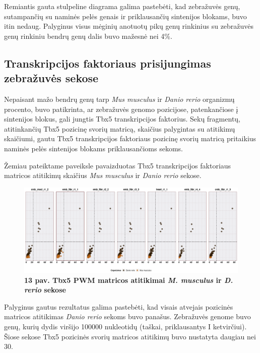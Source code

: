 \documentclass[12pt]{article}
\begin{document}
Remiantis gauta stulpeline diagrama galima pastebėti, kad zebražuvės genų,
sutampančių su naminės pelės genais ir priklausančių sintenijos blokams, buvo
itin nedaug. Palyginus visus mėginių anotuotų pikų genų rinkinius su zebražuvės
genų rinkiniu bendrų genų dalis buvo mažesnė nei 4\%.

\newpage

\subsection{Transkripcijos faktoriaus prisijungimas zebražuvės sekose}
Nepaisant mažo bendrų genų tarp \emph{Mus musculus} ir \emph{Danio rerio}
organizmų procento, buvo patikrinta, ar zebražuvės genomo pozicijose,
patenkančiose į sintenijos blokus, gali jungtis Tbx5 transkripcijos faktorius.
Sekų fragmentų, atitinkančių Tbx5 pozicinę svorių matricą, skaičius palygintas
su atitikimų skaičiumi, gautu Tbx5 transkripcijos faktoriaus pozicinę svorių
matricą pritaikius naminės pelės sintenijos blokams priklausančioms sekoms.

Žemiau pateiktame paveiksle pavaizduotas Tbx5 transkripcijos faktoriaus matricos
atitikimų skaičius \emph{Mus musculus} ir \emph{Danio rerio} sekose.

\begin{figure}[htb]
    \begin{center}
        \includegraphics[width=1\linewidth]{../Figures/PWM_matches_all.png}
        \vspace{-2\baselineskip}
        \caption*{\small\textbf{13 pav. Tbx5 PWM matricos atitikimai
        \emph{M. musculus} ir \emph{D. rerio} sekose}}
        \label{fig:13}
    \end{center}
\end{figure}

Palyginus gautus rezultatus galima pastebėti, kad visais atvejais pozicinės
matricos atitikimas \emph{Danio rerio} sekoms buvo panašus. Zebražuvės genome
buvo genų, kurių dydis viršijo 100000 nukleotidų (taškai, priklausantys I
ketvirčiui). Šiose sekose Tbx5 pozicinės svorių matricos atitikimų buvo
nustatyta daugiau nei 30.
\end{document}
